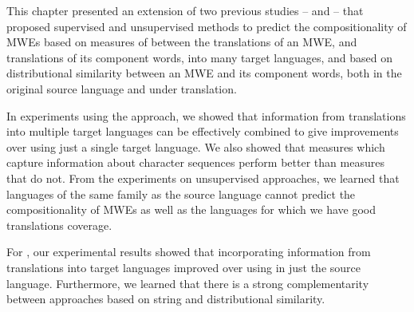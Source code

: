 \documentclass[output=paper
,modfonts
,nonflat]{langsci/langscibook}
\begin{document}



This chapter presented an extension of two previous studies --
\cite{salehi2013} and \cite{DBLP:conf/eacl/SalehiCB14} -- that
proposed supervised and unsupervised methods to predict the
compositionality of MWEs based on measures of 
between the translations of an MWE, and translations of its component
words, into many target languages, and based on distributional
similarity between an MWE and its component words, both in the
original source language and under translation.

In experiments using the  approach, we showed that
information from translations into multiple target languages can be
effectively combined to give improvements over using just a single
target language. We also showed that  measures which
capture information about character sequences perform better than
measures that do not. From the experiments on unsupervised approaches,
we learned that languages of the same family as the source language
cannot predict the compositionality of MWEs as well as the languages
for which we have good translations coverage.

For , our experimental results showed that
incorporating information from translations into target languages
improved over using  in just the source
language. Furthermore, we learned that there is a strong
complementarity between approaches based on string and distributional
similarity.




\end{document}
